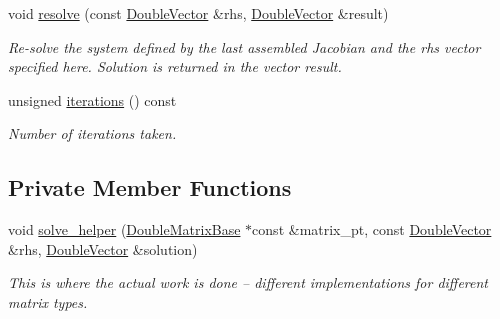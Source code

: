 \begin{DoxyCompactItemize}
void \hyperlink{classoomph_1_1DampedJacobi_a571fae40f40b528e76a0636f140010e7}{resolve} (const \hyperlink{classoomph_1_1DoubleVector}{Double\+Vector} \&rhs, \hyperlink{classoomph_1_1DoubleVector}{Double\+Vector} \&result)
\begin{DoxyCompactList}\small\item\em Re-\/solve the system defined by the last assembled Jacobian and the rhs vector specified here. Solution is returned in the vector result. \end{DoxyCompactList}\item 
unsigned \hyperlink{classoomph_1_1DampedJacobi_aa72fe9dcf19728a8b5a75f0cadb36013}{iterations} () const
\begin{DoxyCompactList}\small\item\em Number of iterations taken. \end{DoxyCompactList}\end{DoxyCompactItemize}
\subsection*{Private Member Functions}
\begin{DoxyCompactItemize}
\item 
void \hyperlink{classoomph_1_1DampedJacobi_a8293439927a99030a1508f268be8a876}{solve\+\_\+helper} (\hyperlink{classoomph_1_1DoubleMatrixBase}{Double\+Matrix\+Base} $\ast$const \&matrix\+\_\+pt, const \hyperlink{classoomph_1_1DoubleVector}{Double\+Vector} \&rhs, \hyperlink{classoomph_1_1DoubleVector}{Double\+Vector} \&solution)
\begin{DoxyCompactList}\small\item\em This is where the actual work is done -- different implementations for different matrix types. \end{DoxyCompactList}\end{DoxyCompactItemize}
